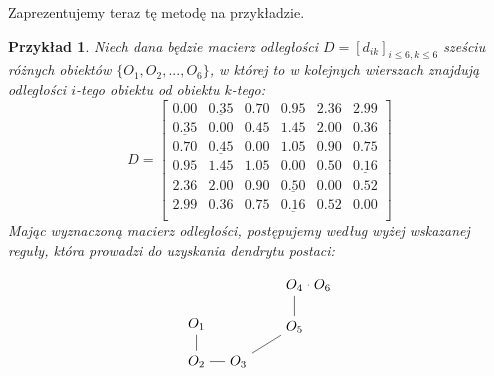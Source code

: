 \documentclass[12pt,a4paper]{report}
\newtheorem{example}{Przykład}
\begin{document}
Zaprezentujemy teraz tę metodę na przykładzie. 
\begin{example}Niech dana będzie macierz odległości $D=[d_{ik}]_{i\leq 6, k \leq 6}$ sześciu różnych obiektów $\{O_{1},O_{2},..., O_{6}\}$, w której to w kolejnych wierszach znajdują odległości $i$-tego obiektu od obiektu $k$-tego:
$$
D= \begin{bmatrix}
0.00 & \underline{0.35} & 0.70 & 0.95 & 2.36 & 2.99 \\
\underline{0.35} & 0.00 & 0.45 & 1.45 & 2.00 & 0.36 \\ 
0.70 & \underline{0.45} & 0.00 & 1.05 & 0.90 & 0.75 \\
0.95 & 1.45 & 1.05 & 0.00 & 0.50 & \underline{0.16} \\
2.36 & 2.00 & 0.90 & \underline{0.50} & 0.00 & 0.52 \\
2.99 & 0.36 & 0.75 & \underline{0.16} & 0.52 & 0.00  \\
\end{bmatrix}    
$$
Mając wyznaczoną macierz odległości, postępujemy według wyżej wskazanej reguły, która prowadzi do uzyskania dendrytu postaci:


$$
\begin{tikzpicture}[scale=.7]
  \node (1) at (0.0,0.1) {$O_{1}$};
  \node (2) at (0.0,-1.25) {$O_{2}$};
  \node (3) at (1.5,-1.25) {$O_{3}$};
 \node (4) at (3.5,1.5) {$O_{4}$};
 \node (5) at (3.5,0.00) {$O_{5}$};
 \node (6) at (4.5,1.5) {$O_{6}$};
 
   \draw (1)--(2)--(3)--(5)--(4)--(6); 
\end{tikzpicture}
$$ 
\end{example}
\end{document}
